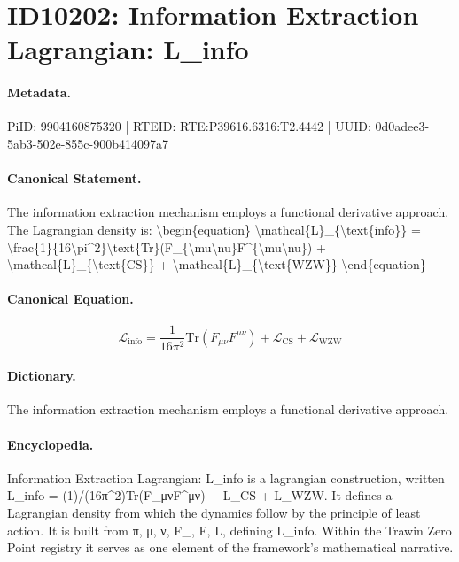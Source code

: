 \section*{ID10202: Information Extraction Lagrangian: L\_info}
\paragraph{Metadata.}
PiID: 9904160875320 | RTEID: RTE:P39616.6316:T2.4442 | UUID: 0d0adee3-5ab3-502e-855c-900b414097a7

\paragraph{Canonical Statement.}
The information extraction mechanism employs a functional derivative approach. The Lagrangian density is: \textbackslash{}begin\{equation\} \textbackslash{}mathcal\{L\}\_\{\textbackslash{}text\{info\}\} = \textbackslash{}frac\{1\}\{16\textbackslash{}pi\textasciicircum{}2\}\textbackslash{}text\{Tr\}(F\_\{\textbackslash{}mu\textbackslash{}nu\}F\textasciicircum{}\{\textbackslash{}mu\textbackslash{}nu\}) + \textbackslash{}mathcal\{L\}\_\{\textbackslash{}text\{CS\}\} + \textbackslash{}mathcal\{L\}\_\{\textbackslash{}text\{WZW\}\} \textbackslash{}end\{equation\}

\paragraph{Canonical Equation.}
\[
\mathcal{L}_{\text{info}} = \frac{1}{16\pi^2}\text{Tr}(F_{\mu\nu}F^{\mu\nu}) + \mathcal{L}_{\text{CS}} + \mathcal{L}_{\text{WZW}}
\]

\paragraph{Dictionary.}
The information extraction mechanism employs a functional derivative approach.

\paragraph{Encyclopedia.}
Information Extraction Lagrangian: L\_info is a lagrangian construction, written L\_info = (1)/(16π\textasciicircum{}2)Tr(F\_μνF\textasciicircum{}μν) + L\_CS + L\_WZW. It defines a Lagrangian density from which the dynamics follow by the principle of least action. It is built from π, μ, ν, F\_, F, L, defining L\_info. Within the Trawin Zero Point registry it serves as one element of the framework's mathematical narrative.
